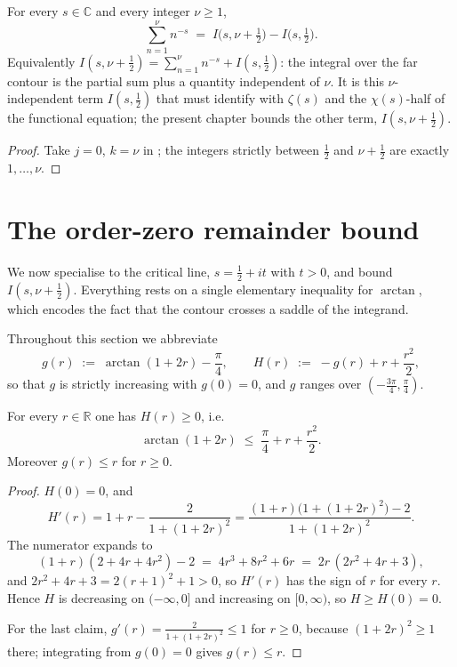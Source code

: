 \begin{corollary}
\label{cor:rs_partial_sum}
\leanok
{}
For every $s\in\mathbb{C}$ and every integer $\nu\ge1$,
\[
  \sum_{n=1}^{\nu}n^{-s}\;=\;I\bigl(s,\nu+\tfrac12\bigr)-I\bigl(s,\tfrac12\bigr).
\]
Equivalently $I(s,\nu+\tfrac12)=\sum_{n=1}^{\nu}n^{-s}+I(s,\tfrac12)$: the integral over
the far contour is the partial sum plus a quantity independent of $\nu$.  It is this
$\nu$-independent term $I(s,\tfrac12)$ that  must identify with
$\zeta(s)$ and the $\chi(s)$-half of the functional equation; the present chapter bounds
the other term, $I(s,\nu+\tfrac12)$.
\end{corollary}

\begin{proof}
\leanok
Take $j=0$, $k=\nu$ in ; the integers strictly between $\tfrac12$ and
$\nu+\tfrac12$ are exactly $1,\dots,\nu$.
\end{proof}

\section{The order-zero remainder bound}
\label{sec:rs_bound}

We now specialise to the critical line, $s=\tfrac12+it$ with $t>0$, and bound
$I(s,\nu+\tfrac12)$.  Everything rests on a single elementary inequality for
$\arctan$, which encodes the fact that the contour crosses a saddle of the integrand.

Throughout this section we abbreviate
\[
  g(r)\;:=\;\arctan(1+2r)-\frac\pi4,\qquad
  H(r)\;:=\;-g(r)+r+\frac{r^{2}}2 ,
\]
so that $g$ is strictly increasing with $g(0)=0$, and $g$ ranges over
$(-\tfrac{3\pi}4,\tfrac\pi4)$.

\begin{lemma}
\label{lem:rs_arctan_quadratic}
\leanok
For every $r\in\mathbb{R}$ one has $H(r)\ge0$, i.e.
\[
  \arctan(1+2r)\;\le\;\frac\pi4+r+\frac{r^{2}}2 .
\]
Moreover $g(r)\le r$ for $r\ge0$.
\end{lemma}

\begin{proof}
\leanok
$H(0)=0$, and
\[
  H'(r)=1+r-\frac{2}{1+(1+2r)^{2}}
   =\frac{(1+r)\bigl(1+(1+2r)^{2}\bigr)-2}{1+(1+2r)^{2}} .
\]
The numerator expands to
\[
  (1+r)(2+4r+4r^{2})-2\;=\;4r^{3}+8r^{2}+6r\;=\;2r\,(2r^{2}+4r+3),
\]
and $2r^{2}+4r+3=2(r+1)^{2}+1>0$, so $H'(r)$ has the sign of $r$ for every $r$.  Hence
$H$ is decreasing on $(-\infty,0]$ and increasing on $[0,\infty)$, so $H\ge H(0)=0$.

For the last claim, $g'(r)=\tfrac2{1+(1+2r)^{2}}\le1$ for $r\ge0$, because
$(1+2r)^{2}\ge1$ there; integrating from $g(0)=0$ gives $g(r)\le r$.
\end{proof}

